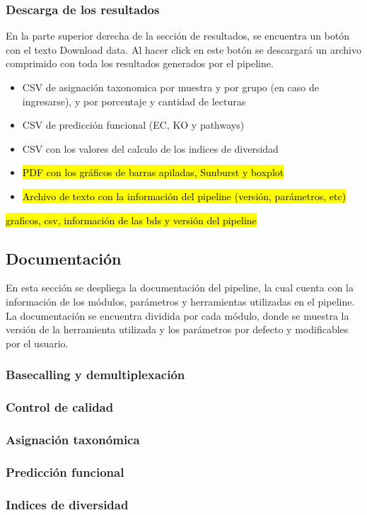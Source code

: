 \subsubsection{Descarga de los resultados}
En la parte superior derecha de la sección de resultados, se encuentra un botón con el texto Download data. Al hacer click en este botón se descargará un archivo comprimido con toda los resultados generados por el pipeline.
\begin{itemize}
    \item CSV de asignación taxonomica por muestra y por grupo (en caso de ingresarse), y por porcentaje y cantidad de lecturas
    \item CSV de predicción funcional (EC, KO y pathways)
    \item CSV con los valores del calculo de los indices de diversidad
    \item \hl{PDF con los gráficos de barras apiladas, Sunburst y boxplot}
    \item \hl{Archivo de texto con la información del pipeline (versión, parámetros, etc)}
\end{itemize}
\hl{graficos, csv, información de las bds y versión del pipeline}
\subsection{Documentación}
En esta sección se despliega la documentación del pipeline, la cual cuenta con la información de los módulos, parámetros y herramientas utilizadas en el pipeline. La documentación se encuentra dividida por cada módulo, donde se muestra la versión de la herramienta utilizada y los parámetros por defecto y modificables por el usuario.
\subsubsection{Basecalling y demultiplexación}
\subsubsection{Control de calidad}
\subsubsection{Asignación taxonómica}
\subsubsection{Predicción funcional}
\subsubsection{Indices de diversidad}

